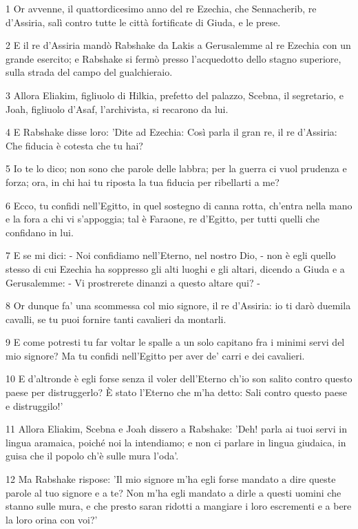 \par 1 Or avvenne, il quattordicesimo anno del re Ezechia, che Sennacherib, re d'Assiria, salì contro tutte le città fortificate di Giuda, e le prese.
\par 2 E il re d'Assiria mandò Rabshake da Lakis a Gerusalemme al re Ezechia con un grande esercito; e Rabshake si fermò presso l'acquedotto dello stagno superiore, sulla strada del campo del gualchieraio.
\par 3 Allora Eliakim, figliuolo di Hilkia, prefetto del palazzo, Scebna, il segretario, e Joah, figliuolo d'Asaf, l'archivista, si recarono da lui.
\par 4 E Rabshake disse loro: 'Dite ad Ezechia: Così parla il gran re, il re d'Assiria: Che fiducia è cotesta che tu hai?
\par 5 Io te lo dico; non sono che parole delle labbra; per la guerra ci vuol prudenza e forza; ora, in chi hai tu riposta la tua fiducia per ribellarti a me?
\par 6 Ecco, tu confidi nell'Egitto, in quel sostegno di canna rotta, ch'entra nella mano e la fora a chi vi s'appoggia; tal è Faraone, re d'Egitto, per tutti quelli che confidano in lui.
\par 7 E se mi dici: - Noi confidiamo nell'Eterno, nel nostro Dio, - non è egli quello stesso di cui Ezechia ha soppresso gli alti luoghi e gli altari, dicendo a Giuda e a Gerusalemme: - Vi prostrerete dinanzi a questo altare qui? -
\par 8 Or dunque fa' una scommessa col mio signore, il re d'Assiria: io ti darò duemila cavalli, se tu puoi fornire tanti cavalieri da montarli.
\par 9 E come potresti tu far voltar le spalle a un solo capitano fra i minimi servi del mio signore? Ma tu confidi nell'Egitto per aver de' carri e dei cavalieri.
\par 10 E d'altronde è egli forse senza il voler dell'Eterno ch'io son salito contro questo paese per distruggerlo? È stato l'Eterno che m'ha detto: Sali contro questo paese e distruggilo!'
\par 11 Allora Eliakim, Scebna e Joah dissero a Rabshake: 'Deh! parla ai tuoi servi in lingua aramaica, poiché noi la intendiamo; e non ci parlare in lingua giudaica, in guisa che il popolo ch'è sulle mura l'oda'.
\par 12 Ma Rabshake rispose: 'Il mio signore m'ha egli forse mandato a dire queste parole al tuo signore e a te? Non m'ha egli mandato a dirle a questi uomini che stanno sulle mura, e che presto saran ridotti a mangiare i loro escrementi e a bere la loro orina con voi?'
